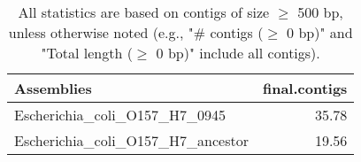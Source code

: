\documentclass[12pt,a4paper]{article}
\begin{document}
\begin{table}[ht]
\begin{center}
\caption{All statistics are based on contigs of size $\geq$ 500 bp, unless otherwise noted (e.g., "\# contigs ($\geq$ 0 bp)" and "Total length ($\geq$ 0 bp)" include all contigs).}
\begin{tabular}{|l*{1}{|r}|}
\hline
Assemblies & final.contigs \\ \hline
Escherichia\_coli\_O157\_H7\_0945 & 35.78 \\ \hline
Escherichia\_coli\_O157\_H7\_ancestor & 19.56 \\ \hline
\end{tabular}
\end{center}
\end{table}
\end{document}
